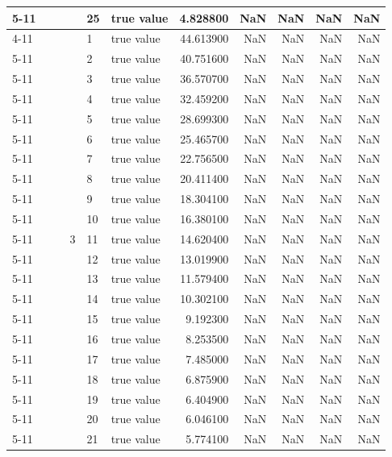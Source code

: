 \begin{tabular}{llllllrrrrr}
\cline{5-11}
 &  &  &  & 25 & true value & 4.828800 & NaN & NaN & NaN & NaN \\
\cline{4-11} \cline{5-11}
 &  &  & \multirow[t]{25}{*}{3} & 1 & true value & 44.613900 & NaN & NaN & NaN & NaN \\
\cline{5-11}
 &  &  &  & 2 & true value & 40.751600 & NaN & NaN & NaN & NaN \\
\cline{5-11}
 &  &  &  & 3 & true value & 36.570700 & NaN & NaN & NaN & NaN \\
\cline{5-11}
 &  &  &  & 4 & true value & 32.459200 & NaN & NaN & NaN & NaN \\
\cline{5-11}
 &  &  &  & 5 & true value & 28.699300 & NaN & NaN & NaN & NaN \\
\cline{5-11}
 &  &  &  & 6 & true value & 25.465700 & NaN & NaN & NaN & NaN \\
\cline{5-11}
 &  &  &  & 7 & true value & 22.756500 & NaN & NaN & NaN & NaN \\
\cline{5-11}
 &  &  &  & 8 & true value & 20.411400 & NaN & NaN & NaN & NaN \\
\cline{5-11}
 &  &  &  & 9 & true value & 18.304100 & NaN & NaN & NaN & NaN \\
\cline{5-11}
 &  &  &  & 10 & true value & 16.380100 & NaN & NaN & NaN & NaN \\
\cline{5-11}
 &  &  &  & 11 & true value & 14.620400 & NaN & NaN & NaN & NaN \\
\cline{5-11}
 &  &  &  & 12 & true value & 13.019900 & NaN & NaN & NaN & NaN \\
\cline{5-11}
 &  &  &  & 13 & true value & 11.579400 & NaN & NaN & NaN & NaN \\
\cline{5-11}
 &  &  &  & 14 & true value & 10.302100 & NaN & NaN & NaN & NaN \\
\cline{5-11}
 &  &  &  & 15 & true value & 9.192300 & NaN & NaN & NaN & NaN \\
\cline{5-11}
 &  &  &  & 16 & true value & 8.253500 & NaN & NaN & NaN & NaN \\
\cline{5-11}
 &  &  &  & 17 & true value & 7.485000 & NaN & NaN & NaN & NaN \\
\cline{5-11}
 &  &  &  & 18 & true value & 6.875900 & NaN & NaN & NaN & NaN \\
\cline{5-11}
 &  &  &  & 19 & true value & 6.404900 & NaN & NaN & NaN & NaN \\
\cline{5-11}
 &  &  &  & 20 & true value & 6.046100 & NaN & NaN & NaN & NaN \\
\cline{5-11}
 &  &  &  & 21 & true value & 5.774100 & NaN & NaN & NaN & NaN \\

\end{tabular}
